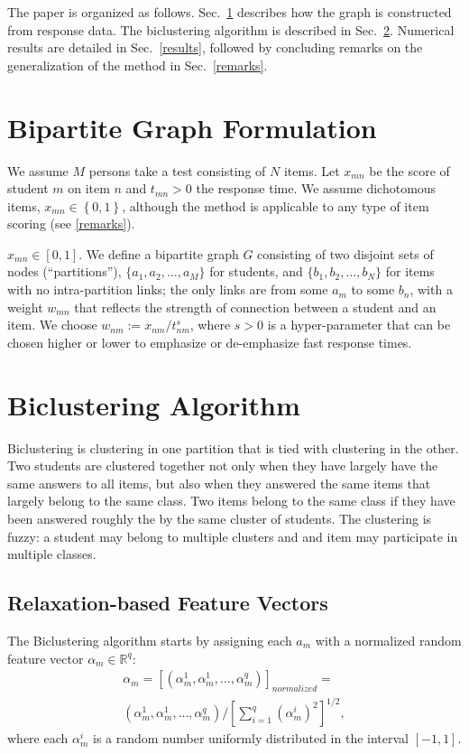 \documentclass{article}
\newcommand{\R}{\mathbb{R}}
\begin{document}
The paper is organized as follows. Sec.~\ref{model} describes how the graph is constructed from response data. The biclustering algorithm is described in Sec.~\ref{biclustering}. Numerical results are detailed in Sec.~\ref{results}, followed by concluding remarks on the generalization of the method in Sec.~\ref{remarks}.

\section{Bipartite Graph Formulation}
\label{model}
We assume $M$ persons take a test consisting of $N$ items. Let $x_{mn}$ be the score of student $m$ on item $n$ and $t_{mn} > 0$ the response time. We assume dichotomous items, $x_{mn} \in \left\{0,1\right\}$, although the method is applicable to any type of item scoring (see \ref{remarks}).

 $x_{mn} \in [0,1]$. We define a bipartite graph $G$ consisting of two disjoint sets of nodes (``partitions''), $\{a_1,a_2,\ldots,a_M\}$ for students, and $\{b_1,b_2,\ldots,b_N\}$ for items with no intra-partition links; the only links are from some $a_m$ to some $b_n$, with a weight $w_{mn}$ that reflects the strength of connection between a student and an item. We choose $w_{nm} := x_{nm}/t_{nm}^s$, where $s > 0$ is a hyper-parameter that can be chosen higher or lower to emphasize or de-emphasize fast response times.


\section{Biclustering Algorithm}
\label{biclustering}
Biclustering is clustering in one partition that is tied with clustering in the other. Two students are clustered together not only when they have largely have the same answers to all items, but also when they answered the same items that largely belong to the same class. Two items belong to the same class if they have been answered roughly the by the same cluster of students. The clustering is fuzzy: a student may belong to multiple clusters and and item may participate in multiple classes. 

\subsection{Relaxation-based Feature Vectors}
The Biclustering algorithm starts by assigning each $a_m$ with a normalized random feature vector $\alpha_m \in \R^q$:
\begin{equation}
\begin{split}
  \alpha_m = \left[ (\alpha_m^1,\alpha_m^1,\ldots,\alpha_m^q) \right]_{normalized} =  \\
  (\alpha_m^1,\alpha_m^1,\ldots,\alpha_m^q) /
  \left[ \sum_{i=1}^q (\alpha_m^i)^2 \right]^{1/2},
\end{split}
\end{equation}
where each $\alpha_m^i$ is a random number uniformly distributed in the interval $[-1,1]$. 
\end{document}
